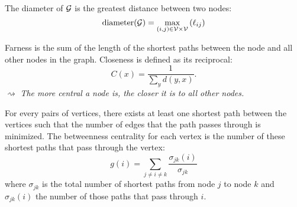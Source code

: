\documentclass[a4 paper]{article}
\begin{document}
  \begin{defn}[diameter]
    The diameter of $\mathcal{G}$ is the greatest distance between two nodes:
    \[
      \mathrm{diameter(\mathcal{G})} = \max_{(i,j)\in\mathcal{V}\times\mathcal{V}} \left(\ell_{ij}\right)
    \]
  \end{defn}
  \begin{defn}
    Farness is the sum of the length of the shortest paths between the node and all other nodes in the graph. Closeness is defined as its reciprocal:
    \[C(x)={\frac  {1}{\sum _{y}d(y,x)}}.\]
    $\rightsquigarrow$ \textit{The more central a node is, the closer it is to all other nodes.}
  \end{defn}
  
  \begin{defn}[Betweenness]
    For every pairs of vertices, there exists at least one shortest path between the vertices such that the number of edges that the path passes through is minimized.
    The betweenness centrality for each vertex is the number of these shortest paths that pass through the vertex: 
    \[
        g(i)=\sum _{{j\neq i\neq k}}{\frac  {\sigma _{{jk}}(i)}{\sigma _{{jk}}}}    
    \]
    where $\sigma _{jk}$ is the total number of shortest paths from node $j$ to node $k$ and $\sigma _{jk}(i)$ the number of those paths that pass through $i$.

  \end{defn}


\end{document}
